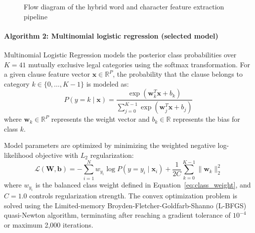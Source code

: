 \begin{figure}[htbp]
\centering
{}
\caption{Flow diagram of the hybrid word and character feature extraction pipeline}\label{fig:tikz_feature_pipeline}
\end{figure}

\paragraph*{Algorithm 2: Multinomial logistic regression (selected model)}
Multinomial Logistic Regression models the posterior class probabilities over $K = 41$ mutually exclusive legal categories using the softmax transformation. For a given clause feature vector $\mathbf{x} \in \mathbb{R}^P$, the probability that the clause belongs to category $k \in \{0, \dots, K-1\}$ is modeled as:
\begin{equation}
    P(y = k \mid \mathbf{x}) = \frac{\exp\left(\mathbf{w}_k^T \mathbf{x} + b_k\right)}{\sum_{j=0}^{K-1} \exp\left(\mathbf{w}_j^T \mathbf{x} + b_j\right)}
    \label{eq:softmax}
\end{equation}
where $\mathbf{w}_k \in \mathbb{R}^P$ represents the weight vector and $b_k \in \mathbb{R}$ represents the bias for class $k$.

Model parameters are optimized by minimizing the weighted negative log-likelihood objective with $L_2$ regularization:
\begin{equation}
    \mathcal{L}(\mathbf{W}, \mathbf{b}) = -\sum_{i=1}^{N} w_{y_i} \log P(y = y_i \mid \mathbf{x}_i) + \frac{1}{2C} \sum_{k=0}^{K-1} \|\mathbf{w}_k\|_2^2
    \label{eq:logreg_loss}
\end{equation}
where $w_{y_i}$ is the balanced class weight defined in Equation~\ref{eq:class_weight}, and $C = 1.0$ controls regularization strength. The convex optimization problem is solved using the Limited-memory Broyden-Fletcher-Goldfarb-Shanno (L-BFGS) quasi-Newton algorithm, terminating after reaching a gradient tolerance of $10^{-4}$ or maximum 2,000 iterations.

